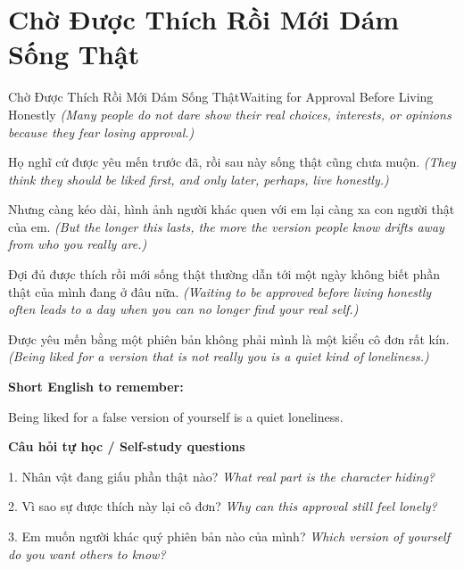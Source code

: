 \section{Chờ Được Thích Rồi Mới Dám Sống Thật}
\begin{truyen}{Chờ Được Thích Rồi Mới Dám Sống Thật}{Waiting for Approval Before Living Honestly}
\textit{(Many people do not dare show their real choices, interests, or opinions because they fear losing approval.)}

Họ nghĩ cứ được yêu mến trước đã, rồi sau này sống thật cũng chưa muộn.
\textit{(They think they should be liked first, and only later, perhaps, live honestly.)}

Nhưng càng kéo dài, hình ảnh người khác quen với em lại càng xa con người thật của em.
\textit{(But the longer this lasts, the more the version people know drifts away from who you really are.)}

Đợi đủ được thích rồi mới sống thật thường dẫn tới một ngày không biết phần thật của mình đang ở đâu nữa.
\textit{(Waiting to be approved before living honestly often leads to a day when you can no longer find your real self.)}

\end{truyen}

\begin{baihoc}
Được yêu mến bằng một phiên bản không phải mình là một kiểu cô đơn rất kín.
\textit{(Being liked for a version that is not really you is a quiet kind of loneliness.)}
\end{baihoc}

\begin{ghinhoanh}
\textbf{Short English to remember:}

Being liked for a false version of yourself is a quiet loneliness.

\end{ghinhoanh}

\begin{tuhocnhanh}
\textbf{Câu hỏi tự học / Self-study questions}

1. Nhân vật đang giấu phần thật nào? \textit{What real part is the character hiding?}

2. Vì sao sự được thích này lại cô đơn? \textit{Why can this approval still feel lonely?}

3. Em muốn người khác quý phiên bản nào của mình? \textit{Which version of yourself do you want others to know?}
\end{tuhocnhanh}
\ngancach

